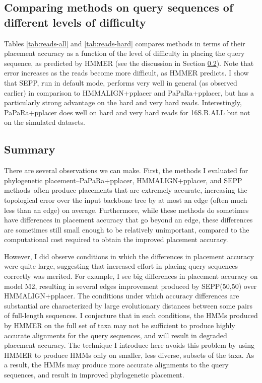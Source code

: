 \subsection{Comparing methods on query sequences of
different levels of difficulty}

Tables \ref{tab:reads-all} and \ref{tab:reads-hard} compares methods in 
terms of their placement accuracy as a function of 
the level of difficulty in placing the query sequence, as
predicted by HMMER (see the discussion in Section \ref{sec:studydesign}).
Note that error increases as the reads become more difficult,
as HMMER predicts.
I show that SEPP, run in default mode, performs very well
in general (as observed earlier) in comparison to
HMMALIGN+pplacer and PaPaRa+pplacer, but has a
particularly strong advantage on the hard and very hard reads.
Interestingly, PaPaRa+pplacer does well on hard
and very hard reads
for 16S.B.ALL but not on the simulated datasets.

\subsection{Summary}\label{sec:studydesign}
There are several observations we can make. First,
the methods I evaluated for
phylogenetic placement--PaPaRa+pplacer, HMMALIGN+pplacer,
and SEPP methods--often produce placements that are extremely accurate,
increasing the topological error over the input backbone tree
by at most an edge (often much less than an edge) on average.
Furthermore, while these methods do sometimes have 
differences in placement accuracy that go beyond an edge,
these differences are sometimes still
small enough to be relatively unimportant, compared 
to the computational cost
required to obtain the improved placement accuracy.

However, I did observe conditions  in which
the differences in placement accuracy were quite large, suggesting
that increased effort in placing query sequences correctly was
merited.  For example, 
I see big differences in
placement accuracy on model M2, resulting in
several edges improvement produced by SEPP(50,50)
over HMMALIGN+pplacer.
The  conditions under which
accuracy differences are substantial are characterized by large evolutionary
distances between some pairs of full-length sequences.
I conjecture that in such conditions, the HMMs produced by HMMER on
the full set of taxa may
not be sufficient to produce highly accurate alignments for the
query sequences, and will result in degraded placement accuracy.
The technique I introduce here avoids this problem by using HMMER to
produce HMMs
only on smaller, less diverse, subsets of the taxa.  As a result,
the HMMs may produce more accurate alignments to the query sequences,
and result in improved phylogenetic placement.

